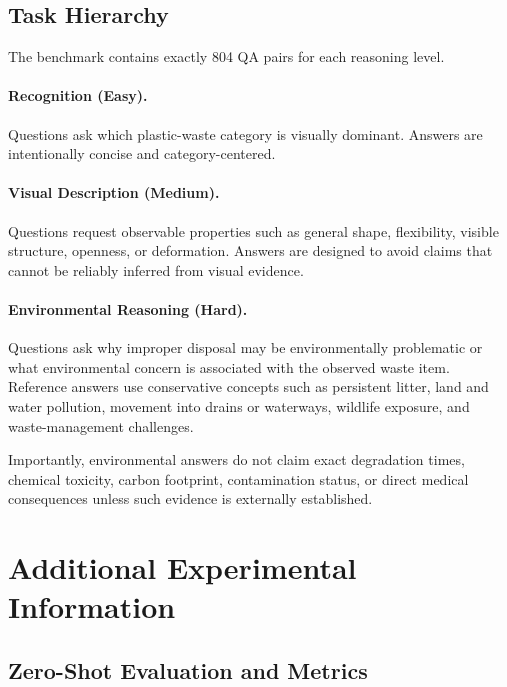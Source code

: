 \documentclass{article}
\begin{document}
\subsection{Task Hierarchy}
\label{subsec:task_hierarchy}

The benchmark contains exactly 804 QA pairs for each reasoning level.

\paragraph{Recognition (Easy).}
Questions ask which plastic-waste category is visually dominant. Answers are intentionally concise and category-centered.

\paragraph{Visual Description (Medium).}
Questions request observable properties such as general shape, flexibility, visible structure, openness, or deformation. Answers are designed to avoid claims that cannot be reliably inferred from visual evidence.

\paragraph{Environmental Reasoning (Hard).}
Questions ask why improper disposal may be environmentally problematic or what environmental concern is associated with the observed waste item. Reference answers use conservative concepts such as persistent litter, land and water pollution, movement into drains or waterways, wildlife exposure, and waste-management challenges.

Importantly, environmental answers do not claim exact degradation times, chemical toxicity, carbon footprint, contamination status, or direct medical consequences unless such evidence is externally established. 

\section{Additional Experimental Information}
\label{appendix:metrics}
\subsection{Zero-Shot Evaluation and Metrics}
\end{document}

